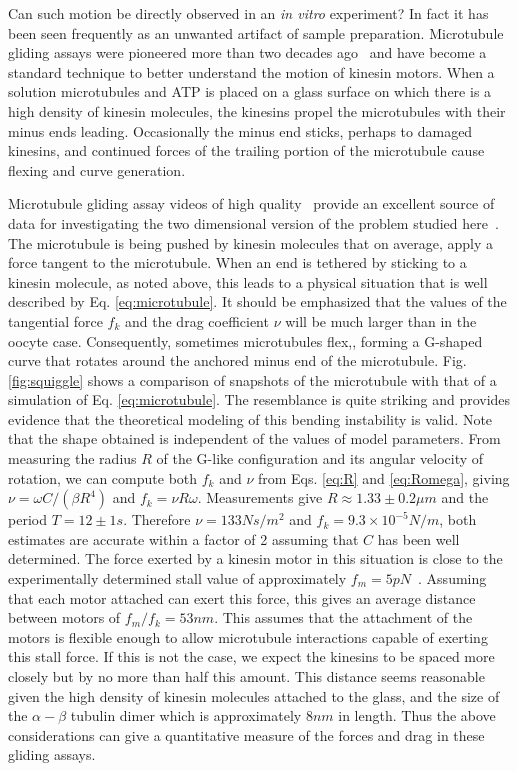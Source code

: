\documentclass[11pt]{ucthesis}
\begin{document}
Can such motion be directly observed in an {\em in vitro}
experiment?  In fact it has been seen frequently as an unwanted artifact
of sample preparation.
Microtubule gliding assays were pioneered more than two
decades ago~\cite{ValeSchnappEtAl} and have become a
standard technique to better understand the motion of kinesin motors.
When a solution microtubules and ATP is placed on a glass surface on
which there is a high density of kinesin molecules, the kinesins propel
the microtubules with their minus ends leading.  Occasionally the minus
end sticks, perhaps to damaged kinesins, and continued forces of the
trailing portion of the microtubule cause flexing and curve generation.

Microtubule gliding assay videos of high quality~\cite{MaloneyHerskowitzKoch} provide an excellent
source of data for investigating the two dimensional version of the problem
studied here~\cite{MaloneyKochVideo}. The microtubule is being pushed by kinesin molecules
that on average, apply a force tangent to the microtubule. When an
end is tethered by sticking to a kinesin molecule, as noted above, this leads to 
a physical situation that is well described by Eq. \ref{eq:microtubule}. It should be
emphasized that the values of the tangential force $f_k$ and the drag
coefficient $\nu$ will be much larger than in the oocyte case.
Consequently, sometimes microtubules flex,, 
forming a G-shaped curve that rotates around the anchored minus end 
of the microtubule.  Fig. \ref{fig:squiggle} shows a comparison of
snapshots of the microtubule with that of a
simulation of Eq. \ref{eq:microtubule}. The resemblance is quite striking and provides evidence that
the theoretical modeling of this bending instability is valid. Note that
the shape obtained is independent of the values of model parameters. From
measuring the radius $R$ of the G-like configuration and its angular
velocity of rotation, we can compute both $f_k$ and $\nu$ from Eqs.
\ref{eq:R} and \ref{eq:Romega}, giving  $\nu = \omega C/(\beta R^4)$
and $f_k = \nu R \omega$. Measurements give $R \approx 1.33 \pm 0.2
\mu m$ and the period $T = 12 \pm 1 s$. Therefore $\nu = 133 N s/m^2$
and $f_k =  9.3\times 10^{-5} N/m$, both estimates are accurate within
a factor of 2 assuming that $C$ has been well determined.  The force
exerted by a kinesin motor in this situation is close to the experimentally determined stall
value of approximately $f_m = 5 pN$~\cite{MeyhoferHoward}. Assuming that
each motor attached can exert this force, this gives
an average distance between motors of $f_m/f_k = 53 nm$. This assumes that
the attachment of the motors is flexible enough to allow microtubule interactions capable of exerting this stall force. If
this is not the case, we expect the kinesins to be spaced more closely but
by no more than half this amount. This distance
seems reasonable given the high density of kinesin molecules attached
to the glass, and the size of the $\alpha-\beta$ tubulin dimer which is
approximately $8 nm$ in length. Thus the above considerations can give
a quantitative measure of the forces and drag in these gliding assays.
\end{document}
